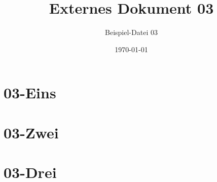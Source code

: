 \documentclass[12pt, headings=small]{scrreprt}
\title{Externes Dokument 03}
\subtitle{Beispiel-Datei 03}
\author{}
\date{\today}
\begin{document}
\maketitle
\tableofcontents
  \chapter{03-Eins}
		\label{cha:Eins}
		\blindtext[2]

		\blindtext[2]

	\chapter{03-Zwei}
		\label{cha:Zwei}
		\blindtext[2]
		
		\blindtext[2]
	\chapter{03-Drei}
		\label{cha:Drei}
		\blindtext[2]
		
		\blindtext[2]
\end{document}

